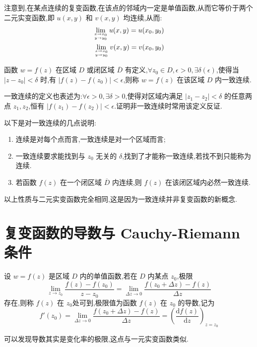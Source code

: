 \documentclass[UTF8]{ctexbook}
\newcommand{\D}{\text{d}}
\newcommand{\derivative}[2]{\frac{\D #1}{\D #2}}
\begin{document}
注意到,在某点连续的复变函数,在该点的邻域内一定是单值函数,从而它等价于两个二元实变函数,即 $u(x,y)$ 和 $v(x,y)$ 均连续,从而:
\begin{align*}
    \lim_{x\to x_0 \atop y\to y_0}u(x,y)=u(x_0,y_0) \\
    \lim_{x\to x_0 \atop y\to y_0}v(x,y)=v(x_0,y_0)
\end{align*}

\begin{definition}[一致连续]
    函数 $w=f(z)$ 在区域 $D$ 或闭区域 $\overline{D}$ 有定义,$\forall z_0\in D,\epsilon>0,\exists\delta(\epsilon)$,使得当 $|z-z_0|<\delta$ 时,有 $|f(z)-f(z_0)|<\epsilon$,则称 $w=f(z)$ 在该区域 $D$ 内一致连续.

    一致连续的定义也表述为:$\forall\epsilon>0,\exists\delta>0$,使得对区域内满足 $|z_1-z_2|<\delta$ 的任意两点 $z_1,z_2$,恒有 $|f(z_1)-f(z_2)|<\epsilon$.证明非一致连续时常用该定义反证.
\end{definition}

以下是对一致连续的几点说明:
\begin{enumerate}
    \item 连续是对每个点而言,一致连续是对一个区域而言;
    \item 一致连续要求能找到与 $z_0$ 无关的 $\delta$,找到了才能称一致连续,若找不到只能称为连续.
    \item 若函数 $f(z)$ 在一个闭区域 $\overline{D}$ 内连续,则 $f(z)$ 在该闭区域内必然一致连续.
\end{enumerate}

以上性质与二元实变函数完全相同,这是因为一致连续并非复变函数的新概念.

\section{复变函数的导数与 Cauchy-Riemann 条件}

\begin{definition}
    设 $w=f(z)$ 是区域 $D$ 内的单值函数,若在 $D$ 内某点 $z_0$,极限
    \[
    \lim_{z\to z_0}\frac{f(z)-f(z_0)}{z-z_0} = \lim_{\Delta z\to 0} \frac{f(z_0+\Delta z)-f(z)}{\Delta z}
    \]
    存在,则称 $f(z)$ 在 $z_0$处可到,极限值为函数 $f(z)$ 在 $z_0$ 的导数,记为
    \[
    f'(z_0) = \lim_{\Delta z\to 0}\frac{f(z_0+\Delta z)-f(z)}{\Delta z}=\left( \derivative{f(z)}{z} \right)_{z=z_0}
    \]
\end{definition}

可以发现导数其实是变化率的极限,这点与一元实变函数类似.
\end{document}
